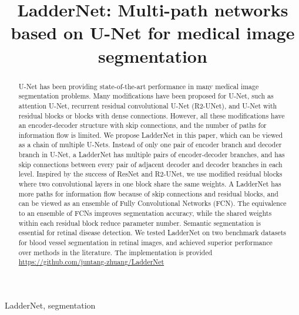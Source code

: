 \documentclass{article}
\title{LadderNet: Multi-path networks based on U-Net for medical image segmentation}
\begin{document}
\maketitle
\begin{abstract}
U-Net has been providing state-of-the-art performance in many medical image segmentation problems. Many modifications have been proposed for U-Net, such as attention U-Net, recurrent residual convolutional U-Net (R2-UNet), and U-Net with residual blocks or blocks with dense connections. However, all these modifications have an encoder-decoder structure with skip connections, and the number of paths for information flow is limited. We propose LadderNet in this paper, which can be viewed as a chain of multiple U-Nets. Instead of only one pair of encoder branch and decoder branch in U-Net, a LadderNet has multiple pairs of encoder-decoder branches, and has skip connections between every pair of adjacent decoder and decoder branches in each level. Inspired by the success of ResNet and R2-UNet, we use modified residual blocks where two convolutional layers in one block share the same weights. A LadderNet has more paths for information flow because of skip connections and residual blocks, and can be viewed as an ensemble of Fully Convolutional Networks (FCN). The equivalence to an ensemble of FCNs improves segmentation accuracy, while the shared weights within each residual block reduce parameter number. Semantic segmentation is essential for retinal disease detection. We tested LadderNet on two benchmark datasets for blood vessel segmentation in retinal images, and achieved superior performance over methods in the literature. The implementation is provided \url{https://github.com/juntang-zhuang/LadderNet} 
\end{abstract}
\begin{keywords}
LadderNet, segmentation
\end{keywords}
\end{document}
